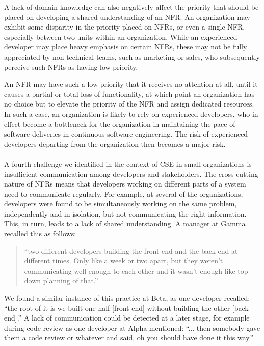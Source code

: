 \documentclass[smallextended]{svjour3}        %
\providecommand{\DIFaddtex}[1]{{\protect\color{blue}\uwave{#1}}} %
\providecommand{\DIFaddbegin}{} %
\providecommand{\DIFaddend}{} %
\providecommand{\DIFadd}[1]{\texorpdfstring{\DIFaddtex{#1}}{#1}} %
\newcommand{\DIFaddincludegraphics}[2][]{{\color{blue}\fbox{\DIFOincludegraphics[#1]{#2}}}} %
\DeclareRobustCommand{\DIFaddbegin}{\DIFOaddbegin \let\includegraphics\DIFaddincludegraphics} %
\DeclareRobustCommand{\DIFaddend}{\DIFOaddend \let\includegraphics\DIFOincludegraphics} %
\begin{document}
A lack of domain knowledge can also negatively affect the priority that should be placed on developing a shared understanding of an NFR.
An organization may exhibit some disparity in the priority placed on NFRs, or even a single NFR, especially between two units within an organization.
While an experienced developer may place heavy emphasis on certain NFRs, these may not be fully appreciated by non-technical teams, such as marketing or sales, who subsequently
perceive such NFRs as having low priority.

An NFR may have such a low priority that it receives no attention at all, until it causes a partial or total loss of functionality, at which point an organization has no choice but to elevate the priority of the NFR and assign dedicated resources. In such a case, an organization is likely to rely on experienced developers, who in effect become a bottleneck for the organization in maintaining the pace of software deliveries in continuous software engineering. The risk of experienced developers departing from the organization then becomes a major risk. 


\DIFaddbegin \paragraph{\DIFadd{Inadequate communication}} \DIFaddend A fourth challenge we identified in the context of CSE in small organizations is insufficient communication among developers and stakeholders. The cross-cutting nature of NFRs means that developers working on different parts of a system need to communicate regularly. 
For example, at several of the organizations, developers were found to be simultaneously working on the same problem, independently and in isolation, but not communicating the right information. This, in turn, leads to a lack of shared understanding. 
A manager at Gamma recalled this as follows:
\begin{quote}
    ``two different developers building the front-end and the back-end at different times. Only like a week or two apart, but they weren't communicating well enough to each other and it wasn't enough like top-down planning of that.''
\end{quote}    
We found a similar instance of this practice at Beta, as one developer recalled:
\textmd{``the root of it is we built one half [front-end] without building the other [back-end].''}
A lack of communication could be detected at a later stage, for example during code review as one developer at Alpha mentioned:
\textmd{``... then somebody gave them a code review or whatever and said, oh you should have done it this way.''}
\end{document}
